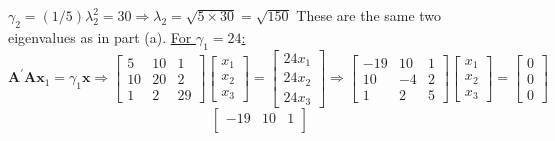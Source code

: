 \begin{enumerate}[font=\bfseries]
\begin{enumerate}
            $\gamma_2=(1/5)\lambda_2^2= 30 \Rightarrow \lambda_2 = \sqrt{5 \times 30} = \sqrt{150}$
            \newline
            These are the same two eigenvalues as in part (a).
            \newline
            \newline
            \underline{For $\gamma_1 = 24$:}
            \[
                \mathbf{A}^\prime\mathbf{A}\mathbf{x}_1 = \gamma_1\mathbf{x}
                \Rightarrow
                \begin{bmatrix}
                    5 & 10 & 1 \\
                    10 & 20 & 2 \\
                    1 & 2 & 29
                \end{bmatrix}
                \begin{bmatrix}
                    x_1 \\
                    x_2 \\
                    x_3
                \end{bmatrix}
                =
                \begin{bmatrix}
                    24 x_1\\
                    24 x_2 \\
                    24 x_3
                \end{bmatrix}
                \Rightarrow
                \begin{bmatrix}
                    -19 & 10 & 1 \\
                    10 & -4 & 2 \\
                    1 & 2 & 5
                \end{bmatrix}
                \begin{bmatrix}
                    x_1 \\
                    x_2 \\
                    x_3
                \end{bmatrix}
                =
                \begin{bmatrix}
                    0 \\
                    0 \\
                    0
                \end{bmatrix}
            \]
            \[
                \begin{bmatrix}
                    -19 & 10 & 1 \\

\end{bmatrix}\]
\end{enumerate}
\end{enumerate}
